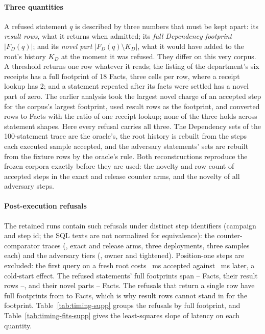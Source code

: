 \documentclass[journal,onecolumn]{IEEEtran}
\newcommand{\code}[1]{\texttt{\detokenize{#1}}}
\begin{document}
\paragraph{Three quantities}
A refused statement $q$ is described by three numbers that must be kept
apart: its \emph{result rows}, what it returns when admitted; its
\emph{full Dependency footprint} $|F_D(q)|$; and its \emph{novel part}
$|F_D(q)\setminus K_D|$, what it would have added to the root's history
$K_D$ at the moment it was refused. They differ on this very corpus. A
threshold \code{count(*)} returns one row whatever it reads; the listing of
the department's six receipts has a full footprint of 18 Facts, three cells
per row, where a receipt lookup has 2; and a statement repeated after its
facts were settled has a novel part of zero. The earlier analysis took the
largest novel charge of an accepted step for the corpus's largest footprint,
used result rows as the footprint, and converted rows to Facts with the ratio
of one receipt lookup; none of the three holds across statement shapes. Here
every refusal carries all three. The Dependency sets of the 100-statement
trace are the oracle's, the root history is rebuilt from the steps each
executed sample accepted, and the adversary statements' sets are rebuilt from
the fixture rows by the oracle's rule. Both reconstructions reproduce the
frozen corpora exactly before they are used: the novelty and row count of
\TimingCounterChecked{} accepted steps in the exact and release counter arms,
and the novelty of all \TimingAdversaryChecked{} adversary steps.

\paragraph{Post-execution refusals}
The retained runs contain \TimingRefusals{} such refusals under
\TimingDistinctStatements{} distinct step identifiers (campaign and step id;
the SQL texts are not normalized for equivalence): the counter-comparator traces
(\code{pilot-counter-rigor-03}, exact and release arms, three deployments,
three samples each) and the adversary tiers (\code{pilot-adversary-05}, owner
and tightened). Position-one steps are excluded: the first query on a fresh
root costs \TimingAcceptedFirstMS{}~ms accepted against
\TimingAcceptedLaterMS{}~ms later, a cold-start effect. The refused
statements' full footprints span \TimingFullMin{}--\TimingFullMax{} Facts,
their result rows \TimingRowsMin{}--\TimingRowsMax{}, and their novel parts
\TimingNovelMin{}--\TimingNovelMax{} Facts. The \TimingOneRowRefusals{}
refusals that return a single row have full footprints from
\TimingOneRowFullMin{} to \TimingOneRowFullMax{} Facts, which is why result
rows cannot stand in for the footprint. Table~\ref{tab:timing-supp} groups the
refusals by full footprint, and Table~\ref{tab:timing-fits-supp} gives the
least-squares slope of latency on each quantity.
\end{document}
